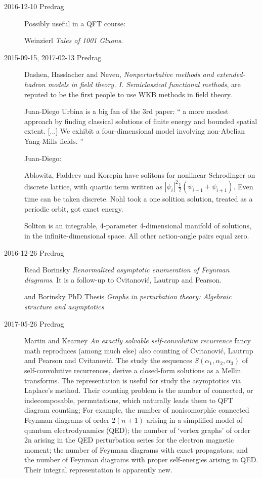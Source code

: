 \begin{description}
\item[2016-12-10 Predrag] Possibly useful in a QFT course:

Weinzierl {\em Tales of 1001 Gluons}.

\item[2015-09-15, 2017-02-13 Predrag]
Dashen, Hasslacher and Neveu,
\emph{Nonperturbative methods and extended-hadron models in field theory.
{I}. {Semiclassical} functional methods},
are reputed to be the first people to use WKB methods in field theory.


Juan-Diego Urbina is a big fan of the 3rd paper:
``
a more modest approach by finding classical
solutions of finite energy and bounded spatial extent.
[...]
We exhibit a four-dimensional model involving non-Abelian Yang-Mills fields.
''

Juan-Diego:

Ablowitz, Faddeev and Korepin have solitons for nonlinear Schrodinger on discrete
lattice, with quartic term written as
$|\psi_i|^2\frac{1}{2}(\psi_{i-1}+\psi_{i+1})$. Even time can be taken
discrete. Nohl took a one solition solution, treated as a periodic
orbit, got exact energy.

Soliton is an integrable, 4-parameter 4-dimensional manifold of solutions, in the
infinite-dimensional space. All other action-angle pairs equal zero.

\item[2016-12-26 Predrag] Read
Borinsky
{\em Renormalized asymptotic enumeration of {Feynman} diagrams}.
It is a follow-up to Cvitanovi\'c, Lautrup and Pearson.

and Borinsky PhD Thesis
{\em Graphs in perturbation theory: {Algebraic} structure and asymptotics}

\item[2017-05-26 Predrag]
Martin and Kearney
{\em An exactly solvable self-convolutive recurrence} fancy math
reproduces (among much else) also counting of
Cvitanovi\'c, Lautrup and Pearson
and
Cvitanovi\'c.
The study the sequences $S(\alpha_1, \alpha_2, \alpha_3)$ of
self-convolutive recurrences, derive a closed-form solutions as a Mellin
transforms.
The representation is useful for study the asymptotics via Laplace's
method. Their counting problem is the number of connected, or
indecomposable, permutations, which naturally leads them to QFT diagram
counting; For example, the number of nonisomorphic connected Feynman
diagrams of order $2(n + 1)$ arising in a simplified model of quantum
electrodynamics (QED); the number of `vertex graphs' of
order 2n arising in the QED perturbation series for the electron magnetic
moment; the number of Feynman diagrams with exact
propagators; and the number of Feynman diagrams with proper
self-energies arising in QED.
Their integral representation is apparently new.


\end{description}
